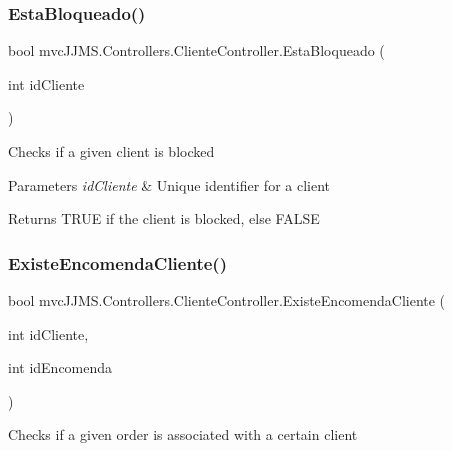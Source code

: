 \subsubsection{\texorpdfstring{Esta\+Bloqueado()}{EstaBloqueado()}}
{\footnotesize\ttfamily bool mvc\+J\+J\+M\+S.\+Controllers.\+Cliente\+Controller.\+Esta\+Bloqueado (\begin{DoxyParamCaption}\item[{int}]{id\+Cliente }\end{DoxyParamCaption})\hspace{0.3cm}{\ttfamily [inline]}}



Checks if a given client is blocked 


\begin{DoxyParams}{Parameters}
{\em id\+Cliente} & Unique identifier for a client\\
\hline
\end{DoxyParams}
\begin{DoxyReturn}{Returns}
T\+R\+UE if the client is blocked, else F\+A\+L\+SE
\end{DoxyReturn}
\mbox{\label{classmvc_j_j_m_s_1_1_controllers_1_1_cliente_controller_a5ab387b5c0be1e73a0ec1c468cc3ac5e}} 
\subsubsection{\texorpdfstring{Existe\+Encomenda\+Cliente()}{ExisteEncomendaCliente()}}
{\footnotesize\ttfamily bool mvc\+J\+J\+M\+S.\+Controllers.\+Cliente\+Controller.\+Existe\+Encomenda\+Cliente (\begin{DoxyParamCaption}\item[{int}]{id\+Cliente,  }\item[{int}]{id\+Encomenda }\end{DoxyParamCaption})\hspace{0.3cm}{\ttfamily [inline]}}



Checks if a given order is associated with a certain client 



